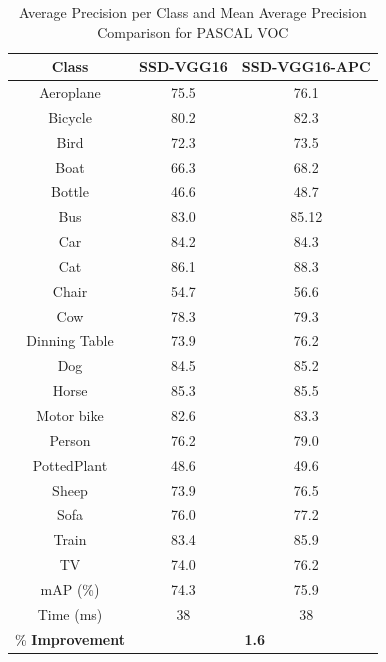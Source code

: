 \documentclass[conference]{IEEEtran}
\begin{document}
\begin{table}
\centering
\caption{Average Precision per Class and Mean Average Precision Comparison for PASCAL VOC}
\label{pascaldata}
\begin{tabular}{|c|c|c|}
\hline
\multirow{1}{*}{\textbf{Class}} & \multirow{1}{*}{\textbf{SSD-VGG16}} & \multirow{1}{*}{\textbf{SSD-VGG16-APC}} \\ \hline
Aeroplane	& 75.5	& 76.1 \\ \hline
Bicycle		& 80.2	& 82.3 \\ \hline
Bird		& 72.3	& 73.5 \\ \hline
Boat		& 66.3	& 68.2 \\ \hline
Bottle	& 46.6	& 48.7	  \\ \hline
Bus	& 83.0	& 85.12 \\ \hline
Car			& 84.2	& 84.3 \\ \hline
Cat & 86.1	& 88.3	\\ \hline
Chair & 54.7	& 56.6	\\ \hline
Cow & 78.3	& 79.3	\\ \hline
Dinning Table & 73.9	& 76.2	\\ \hline
Dog & 84.5	& 85.2	\\ \hline
Horse & 85.3 & 85.5 \\ \hline
Motor bike & 82.6	& 83.3	\\ \hline
Person & 76.2	& 79.0	\\ \hline
PottedPlant & 48.6	& 49.6	\\ \hline
Sheep & 73.9	& 76.5	\\ \hline
Sofa & 76.0	& 77.2	\\ \hline
Train & 83.4	& 85.9	\\ \hline
TV & 74.0	& 76.2	\\ \hline
mAP	(\%)		& 74.3	& 75.9 \\ \hline
Time (ms)	& 38 & 38 \\ \hline
\% \textbf{Improvement} & \multicolumn{2}{|c|}{\textbf{1.6}} \\ \hline
\end{tabular}
\end{table}
\end{document}
